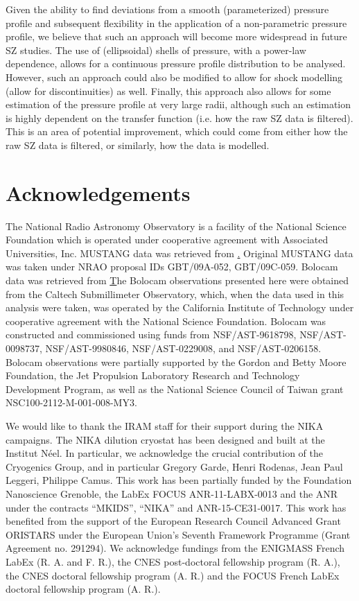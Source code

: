 \documentclass[twocolumn,traditabstract]{aa}
\begin{document}
Given the ability to find deviations from a smooth (parameterized) pressure profile and
subsequent flexibility in the application of a non-parametric pressure profile, we believe that
such an approach will become more widespread in future SZ studies. The use of (ellipsoidal) shells
of pressure, with a power-law dependence, allows for a continuous pressure profile distribution
to be analysed. However, such an approach could also be modified to allow for shock modelling
(allow for discontinuities) as well. Finally, this approach also allows for some estimation of
the pressure profile at very large radii, although such an estimation is highly dependent on the
transfer function (i.e. how the raw SZ data is filtered). This is an area of potential improvement,
which could come from either how the raw SZ data is filtered, or similarly, how the data is modelled.

\section*{Acknowledgements}

The National Radio Astronomy Observatory is a facility of the National Science Foundation which is operated
under cooperative agreement with Associated Universities, Inc. MUSTANG data was retrieved from
\href{https://safe.nrao.edu/wiki/bin/view/GB/Pennarray/MUSTANG_CLASH}. Original MUSTANG data was
taken under NRAO proposal IDs GBT/09A-052, GBT/09C-059. Bolocam data was retrieved from
\href{http://irsa.ipac.caltech.edu/data/Planck/release\_2/ancillary-data/bolocam/}
The Bolocam observations presented here were obtained from the Caltech Submillimeter Observatory, which,
when the data used in this analysis were taken, was operated by the California Institute of Technology under
cooperative agreement with the National Science Foundation. Bolocam was constructed and commissioned using funds
from NSF/AST-9618798, NSF/AST-0098737, NSF/AST-9980846, NSF/AST-0229008, and NSF/AST-0206158. Bolocam observations
were partially supported by the Gordon and Betty Moore Foundation, the Jet Propulsion Laboratory Research and
Technology Development Program, as well as the National Science Council of Taiwan grant NSC100-2112-M-001-008-MY3.

We would like to thank the IRAM staff for their support during the NIKA campaigns. 
The NIKA dilution cryostat has been designed and built at the Institut N\'eel. 
In particular, we acknowledge the crucial contribution of the Cryogenics Group, and 
in particular Gregory Garde, Henri Rodenas, Jean Paul Leggeri, Philippe Camus. 
This work has been partially funded by the Foundation Nanoscience Grenoble, the LabEx FOCUS ANR-11-LABX-0013 and 
the ANR under the contracts ``MKIDS'', ``NIKA'' and ANR-15-CE31-0017. 
This work has benefited from the support of the European Research Council Advanced Grant ORISTARS 
under the European Union's Seventh Framework Programme (Grant Agreement no. 291294).
We acknowledge fundings from the ENIGMASS French LabEx (R. A. and F. R.), 
the CNES post-doctoral fellowship program (R. A.),  the CNES doctoral fellowship program (A. R.) and 
the FOCUS French LabEx doctoral fellowship program (A. R.).
\end{document}
